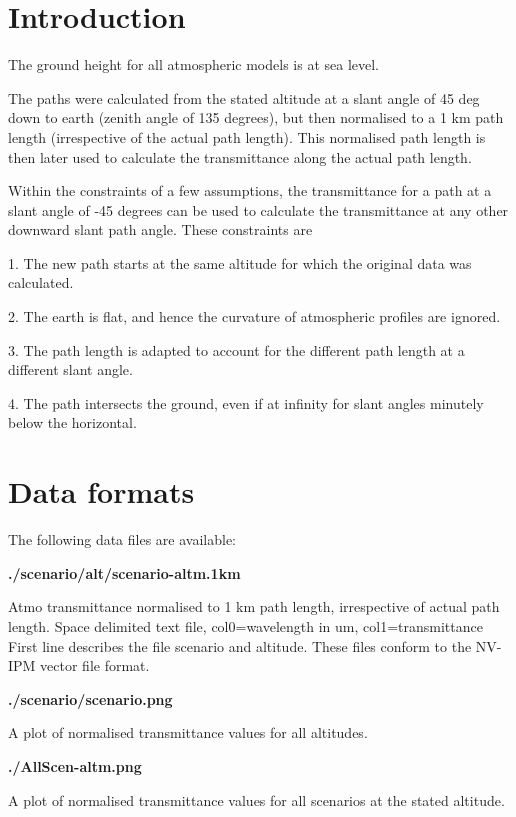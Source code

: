 \documentclass{workpackage}
\begin{document}
\section{Introduction}
\label{sec:Introduction}

The ground height for all atmospheric models is at sea level.


The paths were calculated from the stated altitude at a slant angle of 45 deg down to earth (zenith angle of 135 degrees), but then normalised to a 1 km path length (irrespective of the actual path length).  This normalised path length is then later used to calculate the transmittance along the actual path length.


Within the constraints of a few assumptions, the transmittance for a path at a slant angle of -45 degrees can be used to calculate the transmittance at any other downward slant path angle.  These constraints are 


 1. The new path starts at the same altitude for which the original data was calculated.    


 2. The earth is flat, and hence the curvature of atmospheric profiles are ignored.  


 3. The path length is adapted to account for the different path length at a different slant angle.


 4. The path intersects the ground, even if at infinity for slant angles minutely below the horizontal.



\section{Data formats}
\label{sec:Dataformats}


The following data files are available:


\textbf{./scenario/alt/scenario-altm.1km} 


Atmo transmittance normalised to 1 km path length, irrespective of actual path length.
Space delimited text file, col0=wavelength in um, col1=transmittance
First line describes the file scenario and altitude. 
These files conform to the NV-IPM vector file format.


\textbf{./scenario/scenario.png}


A plot of normalised transmittance values for all altitudes.


\textbf{./AllScen-altm.png}


A plot of normalised transmittance values for all scenarios at the stated altitude.
\end{document}
